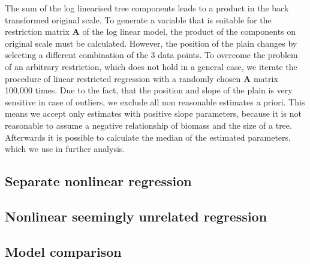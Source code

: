 \documentclass{Vorlage}
\begin{document}
The sum of the log linearised tree components leads to a product in the back transformed original scale. To generate a variable that is suitable for the restriction matrix $\mathbf{A}$ of the log linear model, the product of the components on original scale must be calculated.
However, the position of the plain changes by selecting a different combination of the 3 data points. To overcome the problem of an arbitrary restriction, which does not hold in a general case, we iterate the procedure of linear restricted regression with a randomly chosen $\mathbf{A}$ matrix  100,000 times. Due to the fact, that the position and slope of the plain is very sensitive in case of outliers, we exclude all non reasonable estimates a priori. This means we accept only estimates with positive slope parameters, because it is not reasonable to assume a negative relationship of biomass and the size of a tree. Afterwards it is possible to calculate the median of the estimated parameters, which we use in further analysis.

\subsection{Separate nonlinear regression}



\subsection{Nonlinear seemingly unrelated regression}

\subsection{Model comparison}
\end{document}
